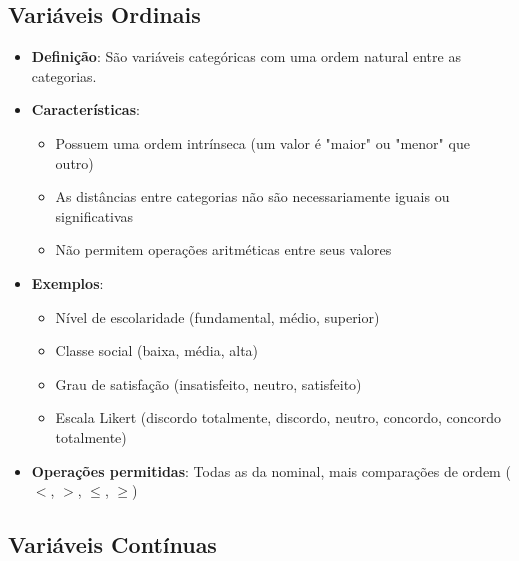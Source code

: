 \subsection{Variáveis Ordinais}

\begin{itemize}
    \item \textbf{Definição}: São variáveis categóricas com uma ordem natural entre as categorias.
    \item \textbf{Características}:
    \begin{itemize}
        \item Possuem uma ordem intrínseca (um valor é "maior" ou "menor" que outro)
        \item As distâncias entre categorias não são necessariamente iguais ou significativas
        \item Não permitem operações aritméticas entre seus valores
    \end{itemize}
    \item \textbf{Exemplos}:
    \begin{itemize}
        \item Nível de escolaridade (fundamental, médio, superior)
        \item Classe social (baixa, média, alta)
        \item Grau de satisfação (insatisfeito, neutro, satisfeito)
        \item Escala Likert (discordo totalmente, discordo, neutro, concordo, concordo totalmente)
    \end{itemize}
    \item \textbf{Operações permitidas}: Todas as da nominal, mais comparações de ordem ($<$, $>$, $\leq$, $\geq$)
\end{itemize}

\subsection{Variáveis Contínuas}

